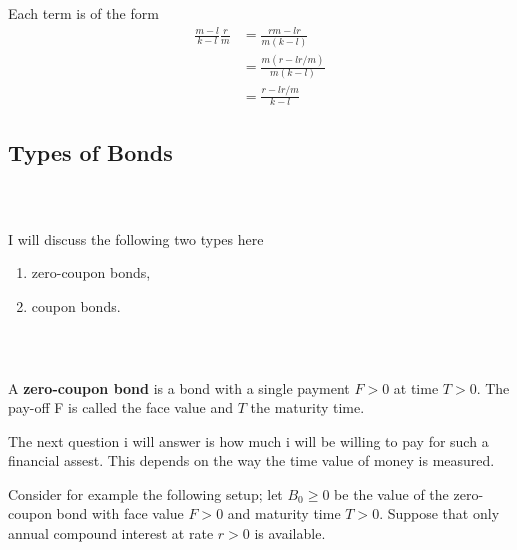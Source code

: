 \documentclass{beamer}
\numberwithin{equation}{section}
\begin{document}
\begin{frame}\frametitle{{\normalsize \secname} \\ {\large \subsecname}}
    Each term is of the form
    \begin{align*}
        \frac{m-l}{k-l} \frac{r}{m} &= \frac{rm - lr}{m(k-l)}\\
        &= \frac{m(r - lr/m)}{m(k - l)}\\
        &= \frac{r - lr/m}{k-l}
    \end{align*}
\end{frame}

\subsection{Types of Bonds}

\begin{frame}\frametitle{{\normalsize \secname} \\ {\large \subsecname}}
    I will discuss the following two types here
    \begin{enumerate}
        \item zero-coupon bonds,
        \item coupon bonds.
    \end{enumerate}
\end{frame}

\begin{frame}\frametitle{{\normalsize \secname} \\ {\large \subsecname}}
    A \textbf{zero-coupon bond} is a bond with a single payment $F > 0$ at time $T > 0$.
    The pay-off F is called the face value and $T$ the maturity time.
    \vspace{1em}

    The next question i will answer is how much i will be willing to pay for such a financial assest.
    This depends on the way the time value of money is measured.
    \vspace{1em}
    
    Consider for example the following setup; let $B_0 \geq 0$ be the value of the zero-coupon bond with face value $F>0$ and maturity time $T>0$.
    Suppose that only annual compound interest at rate $r>0$ is available.
\end{frame}
\end{document}
